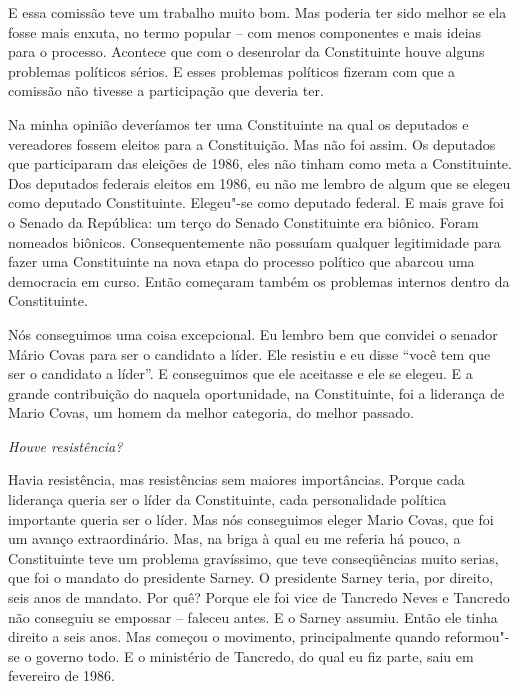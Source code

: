 E essa comissão teve um trabalho muito bom. Mas poderia ter sido melhor
se ela fosse mais enxuta, no termo popular -- com menos componentes e
mais ideias para o processo. Acontece que com o desenrolar da
Constituinte houve alguns problemas políticos sérios. E esses problemas
políticos fizeram com que a comissão não tivesse a participação que
deveria ter.

Na minha opinião deveríamos ter uma Constituinte na qual os deputados e
vereadores fossem eleitos para a Constituição. Mas não foi assim. Os
deputados que participaram das eleições de 1986, eles não tinham como
meta a Constituinte. Dos deputados federais eleitos em 1986, eu não me
lembro de algum que se elegeu como deputado Constituinte. Elegeu"-se como
deputado federal. E mais grave foi o Senado da República: um terço do
Senado Constituinte era biônico. Foram nomeados biônicos.
Consequentemente não possuíam qualquer legitimidade para fazer uma
Constituinte na nova etapa do processo político que abarcou uma
democracia em curso. Então começaram também os problemas internos dentro
da Constituinte.

Nós conseguimos uma coisa excepcional. Eu lembro bem que convidei o
senador Mário Covas para ser o candidato a líder. Ele resistiu e eu
disse ``você tem que ser o candidato a líder''. E conseguimos que ele
aceitasse e ele se elegeu. E a grande contribuição do  naquela
oportunidade, na Constituinte, foi a liderança de Mario Covas, um homem
da melhor categoria, do melhor passado.

\medskip

\noindent\emph{Houve resistência?}

Havia resistência, mas resistências sem maiores
importâncias. Porque cada liderança queria ser o líder da Constituinte,
cada personalidade política importante queria ser o líder. Mas nós
conseguimos eleger Mario Covas, que foi um avanço extraordinário. Mas,
na briga à qual eu me referia há pouco, a Constituinte teve um problema
gravíssimo, que teve conseqüências muito serias, que foi o mandato do
presidente Sarney. O presidente Sarney teria, por direito, seis anos de
mandato. Por quê? Porque ele foi vice de Tancredo Neves e Tancredo não
conseguiu se empossar -- faleceu antes. E o Sarney assumiu. Então ele
tinha direito a seis anos. Mas começou o movimento, principalmente
quando reformou"-se o governo todo. E o ministério de Tancredo, do qual
eu fiz parte, saiu em fevereiro de 1986.

